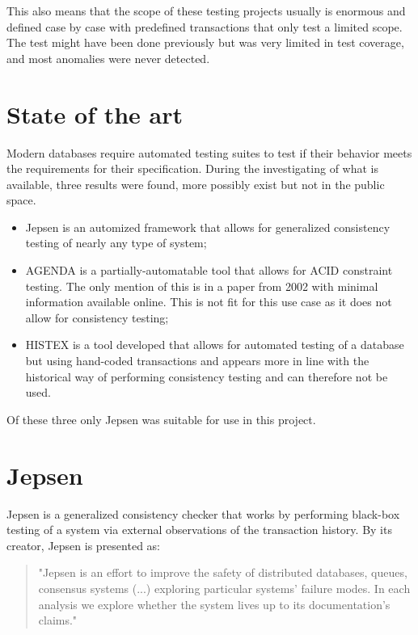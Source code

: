 \documentclass[a4paper,10pt,titlepage]{report}
\begin{document}
This also means that the scope of these testing projects usually is enormous and defined case by case with predefined transactions that only test a limited scope. The test might have been done previously but was very limited in test coverage, and most anomalies were never detected.

\section{State of the art}

Modern databases require automated testing suites to test if their behavior meets the requirements for their specification. During the investigating of what is available, three results were found, more possibly exist but not in the public space.
\begin{itemize}
\item Jepsen is an automized framework that allows for generalized consistency testing of nearly any type of system;
\item AGENDA\cite{AGENDA} is a partially-automatable tool that allows for ACID constraint testing. The only mention of this is in a paper from 2002 with minimal information available online. This is not fit for this use case as it does not allow for consistency testing;
\item HISTEX\cite{HISTEX} is a tool developed that allows for automated testing of a database but using hand-coded transactions and appears more in line with the historical way of performing consistency testing and can therefore not be used.
\end{itemize}

Of these three only Jepsen was suitable for use in this project.

\section{Jepsen}
Jepsen is a generalized consistency checker that works by performing black-box testing of a system via external observations of the transaction history. By its creator, Jepsen is presented as:
\begin{quote}
    "Jepsen is an effort to improve the safety of distributed databases, queues, consensus systems  (...) exploring particular systems' failure modes. In each analysis we explore whether the system lives up to its documentation's claims."\cite{jepsonio}
\end{quote}

\vspace{5mm}
\end{document}
